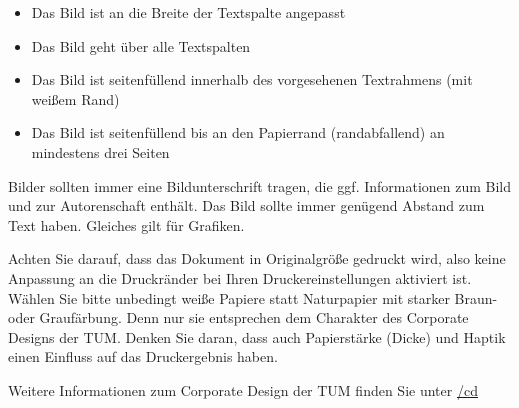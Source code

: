 \begin{itemize}
\item Das Bild ist an die Breite der Textspalte angepasst
\item Das Bild geht über alle Textspalten
\item Das Bild ist seitenfüllend innerhalb des vorgesehenen Textrahmens (mit weißem Rand)
\item Das Bild ist seitenfüllend bis an den Papierrand (randabfallend) an mindestens drei Seiten
\end{itemize}

Bilder sollten immer eine Bildunterschrift tragen, die ggf. Informationen zum Bild und zur Autorenschaft enthält. 
Das Bild sollte immer genügend Abstand zum Text haben. Gleiches gilt für Grafiken.

\ifx\PlakatBeschreibungBeispielbild\TRUE
{}
\fi

\ifx\PlakatBeschreibungDruck\TRUE
{}

Achten Sie darauf, dass das Dokument in Originalgröße gedruckt wird, also keine Anpassung an die Druckränder bei Ihren Druckereinstellungen aktiviert ist.
Wählen Sie bitte unbedingt weiße Papiere statt Naturpapier mit starker Braun- oder Graufärbung. Denn nur sie entsprechen dem Charakter des Corporate Designs der TUM. Denken Sie daran, dass auch Papierstärke (Dicke) und Haptik einen Einfluss auf das Druckergebnis haben.
\fi

\fi %

Weitere Informationen zum Corporate Design der TUM finden Sie unter
\href{http://\UniversitaetWebseite/cd}{\UniversitaetWebseite/cd}
